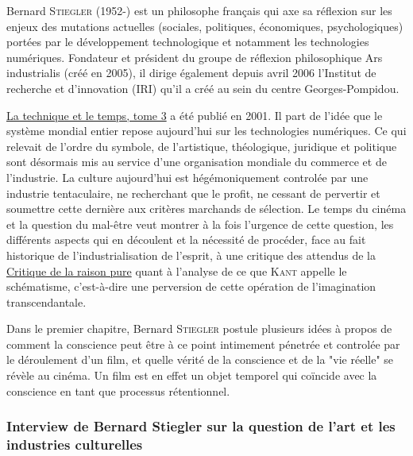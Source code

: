 \documentclass[a4paper,10pt]{article}
\begin{document}
Bernard \textsc{Stiegler} (1952-) est un philosophe français qui axe sa réflexion sur les enjeux des mutations actuelles (sociales, politiques, économiques, psychologiques) portées par le développement technologique et notamment les technologies numériques. Fondateur et président du groupe de réflexion philosophique Ars industrialis (créé en 2005), il dirige également depuis avril 2006 l'Institut de recherche et d'innovation (IRI) qu'il a créé au sein du centre Georges-Pompidou.

\underline{La technique et le temps, tome 3} a été publié en 2001. Il part de l'idée que le système mondial entier repose aujourd'hui sur les technologies numériques. Ce qui relevait de l'ordre du symbole, de l'artistique, théologique, juridique et politique sont désormais mis au service d'une organisation mondiale du commerce et de l'industrie. La culture aujourd'hui est hégémoniquement controlée par une industrie tentaculaire, ne recherchant que le profit, ne cessant de pervertir et soumettre cette dernière aux critères marchands de sélection. Le temps du cinéma et la question du mal-être veut montrer à la fois l’urgence de cette question, les différents aspects qui en découlent et la nécessité de procéder, face au fait historique de l’industrialisation de l’esprit, à une critique des attendus de la \underline{Critique de la raison pure} quant à l’analyse de ce que \textsc{Kant} appelle le schématisme, c'est-à-dire une perversion de cette opération de l’imagination transcendantale.

Dans le premier chapitre, Bernard \textsc{Stiegler} postule plusieurs idées à propos de comment la conscience peut être à ce point intimement pénetrée et controlée par le déroulement d'un film, et quelle vérité de la conscience et de la "vie réelle" se révèle au cinéma. Un film est en effet un objet temporel qui coïncide avec la conscience en tant que processus rétentionnel.

\subsubsection{Interview de Bernard Stiegler sur la question de l'art et les industries culturelles}
\end{document}

